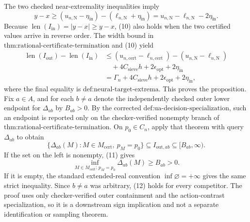 The two checked near-extremality inequalities imply
\[
y-x\geq (u_{n,\mathrm N}-\eta_{\mathrm{in}})
-(\ell_{n,\mathrm N}+\eta_{\mathrm{in}})
=u_{n,\mathrm N}-\ell_{n,\mathrm N}-2\eta_{\mathrm{in}}. \tag{10}
\]
Because \(\operatorname{len}(I_{\mathrm{in}})=|y-x|\geq y-x\), (10) also holds when the two certified values arrive in reverse order.  The width bound in \(\text{thm:rational-certificate-termination}\) and (10) yield
\[
\begin{aligned}
\operatorname{len}(I_{\mathrm{out}})-\operatorname{len}(I_{\mathrm{in}})
&\leq (u_{n,\mathrm{cert}}-\ell_{n,\mathrm{cert}})
-(u_{n,\mathrm N}-\ell_{n,\mathrm N})\\
&\quad+4C_{\mathrm{sieve}}h+2\epsilon_{\mathrm{opt}}+2\eta_{\mathrm{in}}\\
&=\Gamma_n+4C_{\mathrm{sieve}}h+2\epsilon_{\mathrm{opt}}+2\eta_{\mathrm{in}},
\end{aligned}
\]
where the final equality is \(\text{def:neural-target-extrema}\).  This proves the proposition.
Fix \(a\in A\), and for each \(b\ne a\) denote the independently checked outer lower endpoint for \(\Delta_{ab}\) by \(B_{ab}>0\).  By the corrected \(\text{def:ua-decision-specialization}\), such an endpoint is reported only on the checker-verified nonempty branch of \(\text{thm:rational-certificate-termination}\).  On \(p_0\in C_n\), apply that theorem with query \(\Delta_{ab}\) to obtain
\[
\{\Delta_{ab}(M):M\in M_{\mathrm{cert}},\ p_M=p_0\}
\subseteq I_{\mathrm{out},ab}\subseteq[B_{ab},\infty). \tag{11}
\]
If the set on the left is nonempty, (11) gives
\[
\inf_{M\in M_{\mathrm{cert}}:\,p_M=p_0}\Delta_{ab}(M)
\geq B_{ab}>0. \tag{12}
\]
If it is empty, the standard extended-real convention \(\inf\varnothing=+\infty\) gives the same strict inequality.  Since \(b\ne a\) was arbitrary, (12) holds for every competitor.  The proof uses only checker-verified outer containment and the action-contrast specialization, so it is a downstream sign implication and not a separate identification or sampling theorem.

